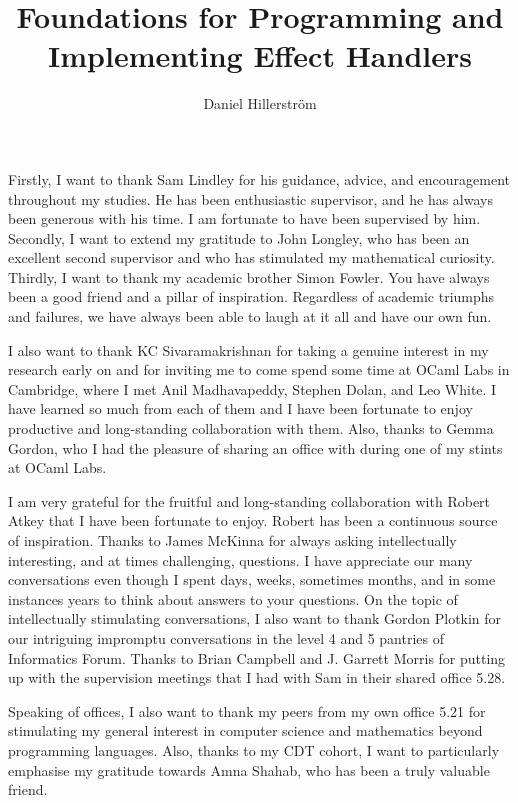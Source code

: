 \documentclass[12pt,phd,lfcs,twoside,openright,logo,leftchapter,normalheadings]{infthesis}
\title{Foundations for Programming and Implementing Effect Handlers}
\author{Daniel Hillerström}
\theoremstyle{plain}
\theoremstyle{definition}
\begin{document}
\raggedbottom
\begin{preliminary}

\maketitle

\begin{acknowledgements}
  Firstly, I want to thank Sam Lindley for his guidance, advice, and
  encouragement throughout my studies. He has been enthusiastic
  supervisor, and he has always been generous with his time. I am
  fortunate to have been supervised by him.
  Secondly, I want to extend my gratitude to John Longley, who has
  been an excellent second supervisor and who has stimulated my
  mathematical curiosity.
  Thirdly, I want to thank my academic brother Simon Fowler. You have
  always been a good friend and a pillar of inspiration. Regardless of
  academic triumphs and failures, we have always been able to laugh at
  it all and have our own fun.

  I also want to thank KC Sivaramakrishnan for taking a genuine
  interest in my research early on and for inviting me to come spend
  some time at OCaml Labs in Cambridge, where I met Anil Madhavapeddy,
  Stephen Dolan, and Leo White. I have learned so much from each of
  them and I have been fortunate to enjoy productive and long-standing
  collaboration with them. Also, thanks to Gemma Gordon, who I had the
  pleasure of sharing an office with during one of my stints at OCaml
  Labs.

  I am very grateful for the fruitful and long-standing collaboration
  with Robert Atkey that I have been fortunate to enjoy. Robert has
  been a continuous source of inspiration.
  Thanks to James McKinna for always asking intellectually
  interesting, and at times challenging, questions. I have appreciate
  our many conversations even though I spent days, weeks, sometimes
  months, and in some instances years to think about answers to your
  questions. On the topic of intellectually stimulating conversations,
  I also want to thank Gordon Plotkin for our intriguing impromptu
  conversations in the level 4 and 5 pantries of Informatics
  Forum. Thanks to Brian Campbell and J. Garrett Morris for putting up
  with the supervision meetings that I had with Sam in their shared
  office 5.28.

  Speaking of offices, I also want to thank my peers from my own
  office 5.21 for stimulating my general interest in computer science
  and mathematics beyond programming languages. Also, thanks to my CDT
  cohort, I want to particularly emphasise my gratitude towards Amna
  Shahab, who has been a truly valuable friend.


\end{acknowledgements}
\end{preliminary}
\end{document}
